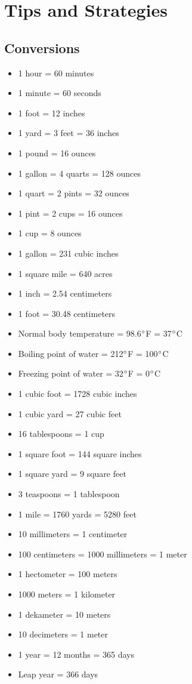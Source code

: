\documentclass[../uilmath.tex]{subfiles}
\begin{document}
\chapter{Tips and Strategies}
\section*{Conversions}
\begin{itemize}
    \item 1 hour = 60 minutes 
    \item 1 minute = 60 seconds 
    \item 1 foot = 12 inches 
    \item 1 yard = 3 feet = 36 inches
    \item 1 pound = 16 ounces 
    \item 1 gallon = 4 quarts = 128 ounces  
    \item 1 quart = 2 pints = 32 ounces 
    \item 1 pint = 2 cups = 16 ounces 
    \item 1 cup = 8 ounces 
    \item 1 gallon = 231 cubic inches
    \item 1 square mile = 640 acres 
    \item 1 inch = 2.54 centimeters 
    \item 1 foot = 30.48 centimeters
    \item Normal body temperature = 98.6$\degree$F = 37$\degree$C 
    \item Boiling point of water = 212$\degree$F = 100$\degree$C 
    \item Freezing point of water = 32$\degree$F = 0$\degree$C 
    \item 1 cubic foot = 1728 cubic inches 
    \item 1 cubic yard = 27 cubic feet 
    \item 16 tablespoons = 1 cup 
    \item 1 square foot = 144 square inches
    \item 1 square yard = 9 square feet 
    \item 3 teaspoons = 1 tablespoon  
    \item 1 mile = 1760 yards = 5280 feet
    \item 10 millimeters = 1 centimeter  
    \item 100 centimeters = 1000 millimeters = 1 meter
    \item 1 hectometer = 100 meters  
    \item 1000 meters = 1 kilometer 
    \item 1 dekameter = 10 meters 
    \item 10 decimeters = 1 meter 
    \item 1 year = 12 months = 365 days 
    \item Leap year = 366 days     
\end{itemize}
\end{document}
